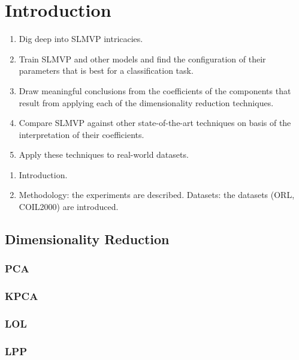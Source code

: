 \chapter{Introduction}




\begin{enumerate}
    \item Dig deep into SLMVP intricacies.
    \item Train SLMVP and other models and find the configuration of their parameters that is best for a classification task.
    \item Draw meaningful conclusions from the coefficients of the components that result from applying each of the dimensionality reduction techniques.
    \item Compare SLMVP against other state-of-the-art techniques on basis of the interpretation of their coefficients.
    \item Apply these techniques to real-world datasets.
\end{enumerate}

\begin{enumerate}
    \item Introduction.
    \item Methodology: the experiments are described.
          \subitem Datasets: the datasets (ORL, COIL2000) are introduced.
\end{enumerate}

\section{Dimensionality Reduction}

\subsection{PCA}
\subsection{KPCA}
\subsection{LOL}
\subsection{LPP}
